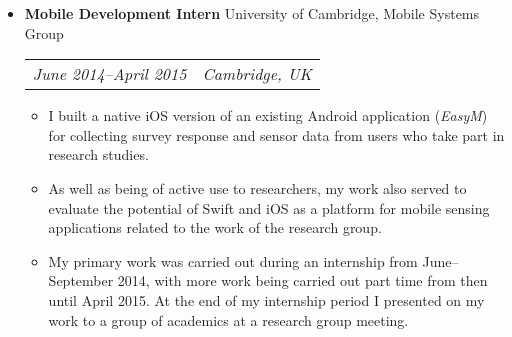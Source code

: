 \documentclass[letterpaper]{article}
\begin{document}
\begin{itemize}
    
    \item \textbf{Mobile Development Intern} University of Cambridge, Mobile Systems Group \\
		\begin{tabular}{c|c}
            \emph{June 2014--April 2015} & \emph{Cambridge, UK}
		\end{tabular}
		\begin{itemize}

            \item I built a native iOS version of an existing Android
                application (\emph{EasyM}) for collecting survey response and
                sensor data from users who take part in research studies.

            \item As well as being of active use to researchers, my work also
                served to evaluate the potential of Swift and iOS as a platform
                for mobile sensing applications related to the work of the
                research group.

            \item My primary work was carried out during an internship from
                June--September 2014, with more work being carried out part time
                from then until April 2015. At the end of my internship period I
                presented on my work to a group of academics at a research group
                meeting.

		\end{itemize}
	




\end{itemize}
\end{document}
